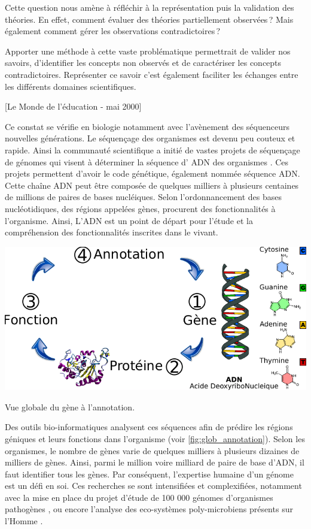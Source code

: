 \begin{refsegment}
Cette question nous amène à réfléchir à la représentation puis la validation des théories. En effet, comment évaluer des théories partiellement observées ? Mais également comment gérer les observations contradictoires ?

Apporter une méthode à cette vaste problématique permettrait de valider nos savoirs, d'identifier les concepts non observés et de caractériser les concepts contradictoires. Représenter ce savoir c'est également faciliter les échanges entre les différents domaines scientifiques.

[Le Monde de l'éducation - mai 2000]

Ce constat se vérifie en biologie notamment avec l'avènement des séquenceurs nouvelles générations. Le séquençage des organismes est devenu peu couteux et rapide. Ainsi la communauté scientifique a initié de vastes projets de séquençage de génomes qui visent à déterminer la séquence d' \gls{ADN} des organismes . Ces projets permettent d'avoir le code génétique, également nommée séquence \gls{ADN}. Cette chaîne \gls{ADN} peut être composée de quelques milliers à plusieurs centaines de millions de paires de bases nucléiques. Selon l'ordonnancement des bases nucléotidiques, des régions appelées gènes, procurent des fonctionnalités à l'organisme. Ainsi, L'\gls{ADN} est un point de départ pour l'étude et la compréhension des fonctionnalités inscrites dans le vivant.


\begin{shadedfigure}
    \centering
    \includegraphics{img/simple_annotation_process.pdf}
    \caption{Vue globale du gène à l'annotation.}
    \label{fig:glob_annotation}
\end{shadedfigure}

Des outils bio-informatiques analysent ces séquences afin de prédire les régions géniques et leurs fonctions dans l'organisme (voir \cref{fig:glob_annotation}). Selon les organismes, le nombre de gènes varie de quelques milliers à plusieurs dizaines de milliers de gènes. Ainsi, parmi le million voire milliard de paire de base d'\gls{ADN}, il faut identifier tous les gènes. Par conséquent, l'expertise humaine d'un génome est un défi en soi. Ces recherches se sont intensifiées et complexifiées, notamment avec la mise en place du projet d'étude de 100 000 génomes d'organismes pathogènes \cite{100kfoodborne}, ou encore l'analyse des eco-systèmes poly-microbiens présents sur l'Homme \cite{hmp}.


\end{refsegment}
